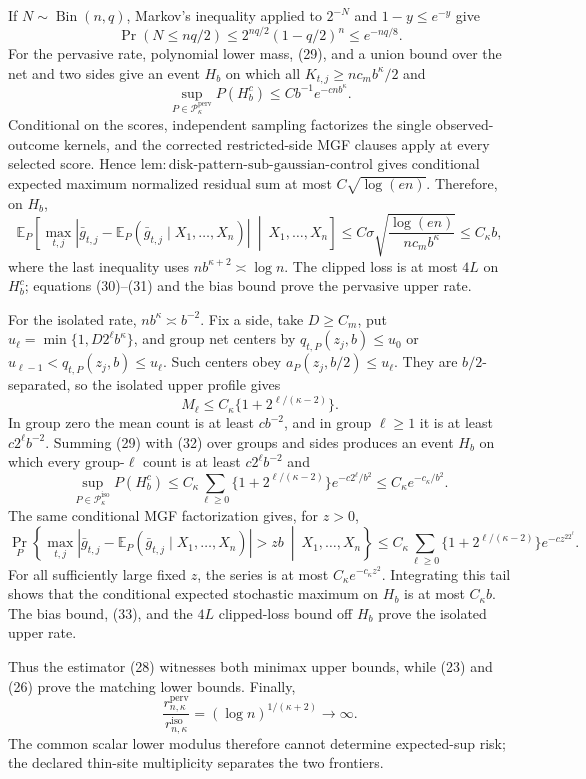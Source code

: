 If \(N\sim\operatorname{Bin}(n,q)\), Markov's inequality applied to \(2^{-N}\) and \(1-y\le e^{-y}\) give
\[
 \Pr(N\le nq/2)\le2^{nq/2}(1-q/2)^n\le e^{-nq/8}. \tag{29}
\]
For the pervasive rate, polynomial lower mass, (29), and a union bound over the net and two sides give an event \(H_b\) on which all \(K_{t,j}\ge nc_mb^\kappa/2\) and
\[
 \sup_{P\in\mathcal P_\kappa^{\mathrm{perv}}}P(H_b^c)
 \le Cb^{-1}e^{-cnb^\kappa}. \tag{30}
\]
Conditional on the scores, independent sampling factorizes the single observed-outcome kernels, and the corrected restricted-side MGF clauses apply at every selected score. Hence \(\mathrm{lem:disk\text{-}pattern\text{-}sub\text{-}gaussian\text{-}control}\) gives conditional expected maximum normalized residual sum at most \(C\sqrt{\log(en)}\). Therefore, on \(H_b\),
\[
 \mathbb E_P\!\left[
 \max_{t,j}|\bar g_{t,j}-\mathbb E_P(\bar g_{t,j}\mid X_1,\ldots,X_n)|
 \ \middle|\ X_1,\ldots,X_n\right]
 \le C\sigma\sqrt{\frac{\log(en)}{nc_mb^\kappa}}\le C_\kappa b, \tag{31}
\]
where the last inequality uses \(nb^{\kappa+2}\asymp\log n\). The clipped loss is at most \(4L\) on \(H_b^c\); equations (30)--(31) and the bias bound prove the pervasive upper rate.

For the isolated rate, \(nb^\kappa\asymp b^{-2}\). Fix a side, take \(D\ge C_m\), put \(u_\ell=\min\{1,D2^\ell b^\kappa\}\), and group net centers by \(q_{t,P}(z_j,b)\le u_0\) or \(u_{\ell-1}<q_{t,P}(z_j,b)\le u_\ell\). Such centers obey \(a_P(z_j,b/2)\le u_\ell\). They are \(b/2\)-separated, so the isolated upper profile gives
\[
 M_\ell\le C_\kappa\{1+2^{\ell/(\kappa-2)}\}. \tag{32}
\]
In group zero the mean count is at least \(cb^{-2}\), and in group \(\ell\ge1\) it is at least \(c2^\ell b^{-2}\). Summing (29) with (32) over groups and sides produces an event \(H_b\) on which every group-\(\ell\) count is at least \(c2^\ell b^{-2}\) and
\[
 \sup_{P\in\mathcal P_\kappa^{\mathrm{iso}}}P(H_b^c)
 \le C_\kappa\sum_{\ell\ge0}\{1+2^{\ell/(\kappa-2)}\}e^{-c2^\ell/b^2}
 \le C_\kappa e^{-c_\kappa/b^2}. \tag{33}
\]
The same conditional MGF factorization gives, for \(z>0\),
\[
 \Pr_P\!\left\{
 \max_{t,j}|\bar g_{t,j}-\mathbb E_P(\bar g_{t,j}\mid X_1,\ldots,X_n)|>zb
 \ \middle|\ X_1,\ldots,X_n\right\}
 \le C_\kappa\sum_{\ell\ge0}\{1+2^{\ell/(\kappa-2)}\}e^{-cz^22^\ell}. \tag{34}
\]
For all sufficiently large fixed \(z\), the series is at most \(C_\kappa e^{-c_\kappa z^2}\). Integrating this tail shows that the conditional expected stochastic maximum on \(H_b\) is at most \(C_\kappa b\). The bias bound, (33), and the \(4L\) clipped-loss bound off \(H_b\) prove the isolated upper rate.

Thus the estimator (28) witnesses both minimax upper bounds, while (23) and (26) prove the matching lower bounds. Finally,
\[
 \frac{r_{n,\kappa}^{\mathrm{perv}}}{r_{n,\kappa}^{\mathrm{iso}}}
 =(\log n)^{1/(\kappa+2)}\longrightarrow\infty.
\]
The common scalar lower modulus therefore cannot determine expected-sup risk; the declared thin-site multiplicity separates the two frontiers.
